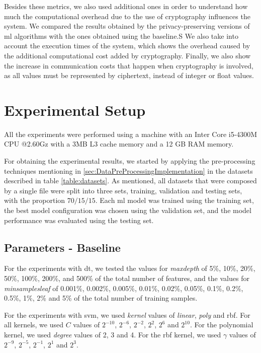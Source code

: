 Besides these metrics, we also used additional ones in order to understand how much the computational overhead due to the use of cryptography influences the system.
We compared the results obtained by the privacy-preserving versions of \ac{ml} algorithms with the ones obtained using the baseline.S
We also take into account the execution times of the system, which shows the overhead caused by the additional computational cost added by cryptography.
Finally, we also show the increase in communication costs that happen when cryptography is involved, as all values must be represented by ciphertext, instead of integer or float values.


\section{Experimental Setup}
\label{sec:ExperimentalSetup}

All the experiments were performed using a machine with an Inter Core i5-4300M CPU @2.60Gz with a 3MB L3 cache memory and a 12 GB RAM memory.

For obtaining the experimental results, we started by applying the pre-processing techniques mentioning in \ref{sec:DataPreProcessingImplementation} in the datasets described in table \ref{table:datasets}. As mentioned, all datasets that were composed by a single file were split into three sets, training, validation and testing sets, with the proportion $70/15/15$. Each \ac{ml} model was trained using the training set, the best model configuration was chosen using the validation set, and the model performance was evaluated using the testing set.

\subsection{Parameters - Baseline}

For the experiments with \ac{dt}, we tested the values for \textit{max\textunderscore depth} of 5\%, 10\%, 20\%, 50\%, 100\%, 200\%, and 500\% of the total number of features, and the values for \textit{min\textunderscore samples\textunderscore leaf} of 0.001\%, 0.002\%, 0.005\%, 0.01\%, 0.02\%, 0.05\%, 0.1\%, 0.2\%, 0.5\%, 1\%, 2\% and 5\% of the total number of training samples.

For the experiments with \ac{svm}, we used \textit{kernel} values of \textit{linear}, \textit{poly} and \ac{rbf}. For all kernels, we used $C$ values of $2^{-10}$, $2^{-6}$, $2^{-2}$, $2^{2}$, $2^{6}$ and $2^{10}$. For the polynomial kernel, we used \textit{degree} values of 2, 3 and 4. For the \ac{rbf} kernel, we used $\gamma$ values of $2^{-9}$, $2^{-5}$, $2^{-1}$, $2^{1}$ and $2^{3}$.

